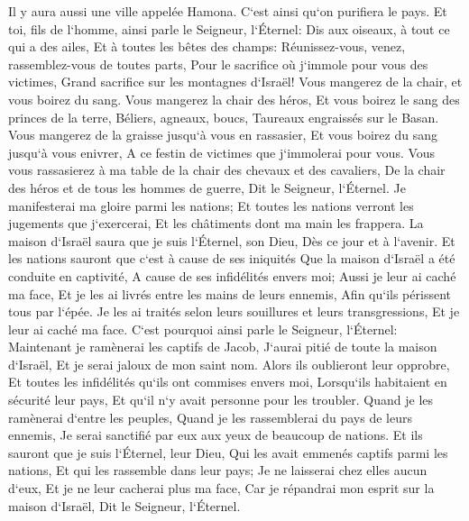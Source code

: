 \verse Il y aura aussi une ville appelée Hamona. C`est ainsi qu`on purifiera le pays. 
\verse Et toi, fils de l`homme, ainsi parle le Seigneur, l`Éternel: Dis aux oiseaux, à tout ce qui a des ailes, Et à toutes les bêtes des champs: Réunissez-vous, venez, rassemblez-vous de toutes parts, Pour le sacrifice où j`immole pour vous des victimes, Grand sacrifice sur les montagnes d`Israël! Vous mangerez de la chair, et vous boirez du sang. 
\verse Vous mangerez la chair des héros, Et vous boirez le sang des princes de la terre, Béliers, agneaux, boucs, Taureaux engraissés sur le Basan. 
\verse Vous mangerez de la graisse jusqu`à vous en rassasier, Et vous boirez du sang jusqu`à vous enivrer, A ce festin de victimes que j`immolerai pour vous. 
\verse Vous vous rassasierez à ma table de la chair des chevaux et des cavaliers, De la chair des héros et de tous les hommes de guerre, Dit le Seigneur, l`Éternel. 
\verse Je manifesterai ma gloire parmi les nations; Et toutes les nations verront les jugements que j`exercerai, Et les châtiments dont ma main les frappera. 
\verse La maison d`Israël saura que je suis l`Éternel, son Dieu, Dès ce jour et à l`avenir. 
\verse Et les nations sauront que c`est à cause de ses iniquités Que la maison d`Israël a été conduite en captivité, A cause de ses infidélités envers moi; Aussi je leur ai caché ma face, Et je les ai livrés entre les mains de leurs ennemis, Afin qu`ils périssent tous par l`épée. 
\verse Je les ai traités selon leurs souillures et leurs transgressions, Et je leur ai caché ma face. 
\verse C`est pourquoi ainsi parle le Seigneur, l`Éternel: Maintenant je ramènerai les captifs de Jacob, J`aurai pitié de toute la maison d`Israël, Et je serai jaloux de mon saint nom. 
\verse Alors ils oublieront leur opprobre, Et toutes les infidélités qu`ils ont commises envers moi, Lorsqu`ils habitaient en sécurité leur pays, Et qu`il n`y avait personne pour les troubler. 
\verse Quand je les ramènerai d`entre les peuples, Quand je les rassemblerai du pays de leurs ennemis, Je serai sanctifié par eux aux yeux de beaucoup de nations. 
\verse Et ils sauront que je suis l`Éternel, leur Dieu, Qui les avait emmenés captifs parmi les nations, Et qui les rassemble dans leur pays; Je ne laisserai chez elles aucun d`eux, 
\verse Et je ne leur cacherai plus ma face, Car je répandrai mon esprit sur la maison d`Israël, Dit le Seigneur, l`Éternel. 

